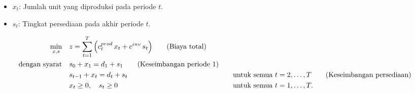 \begin{itemize}
    \item \(x_t\): Jumlah unit yang diproduksi pada periode \(t\).
    \item \(s_t\): Tingkat persediaan pada akhir periode \(t\).
\end{itemize}

\begin{align*}
\min_{x,s} \quad & z = \sum_{t=1}^{T} \Big( c^{prod}_t\, x_t + c^{inv}\, s_t \Big)   \tag{Biaya total} \\
\mbox{dengan syarat}\quad        & s_0 + x_1 = d_1 + s_1   \tag{Keseimbangan periode 1} \\
                 & s_{t-1} + x_t = d_t + s_t &&\quad \mbox{untuk semua } t=2,\dots,T   \tag{Keseimbangan persediaan} \\
                 & x_t \geq 0,\quad s_t \geq 0 &&\quad \mbox{untuk semua } t=1,\dots,T.
\end{align*}

